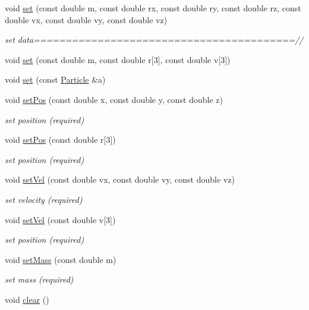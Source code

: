 \begin{DoxyCompactItemize}
void \hyperlink{classParticle_a662b86df904c9a664e0e45d93b1f4715}{set} (const double m, const double rx, const double ry, const double rz, const double vx, const double vy, const double vz)
\begin{DoxyCompactList}\small\item\em set data=========================================// \end{DoxyCompactList}\item 
void \hyperlink{classParticle_a840d9f228177200f22ef062e4cc24851}{set} (const double m, const double r\mbox{[}3\mbox{]}, const double v\mbox{[}3\mbox{]})
\item 
void \hyperlink{classParticle_a77b1b13894b46abed113c461270ed927}{set} (const \hyperlink{classParticle}{Particle} \&a)
\item 
void \hyperlink{classParticle_a97d76b66aed57834c105b78b10643b81}{set\+Pos} (const double x, const double y, const double z)
\begin{DoxyCompactList}\small\item\em set position (required) \end{DoxyCompactList}\item 
void \hyperlink{classParticle_ab3c50e74691f9264d4d4d2e72a6b9536}{set\+Pos} (const double r\mbox{[}3\mbox{]})
\begin{DoxyCompactList}\small\item\em set position (required) \end{DoxyCompactList}\item 
void \hyperlink{classParticle_a07c405254ac3f03854e7523ff473c828}{set\+Vel} (const double vx, const double vy, const double vz)
\begin{DoxyCompactList}\small\item\em set velocity (required) \end{DoxyCompactList}\item 
void \hyperlink{classParticle_a433720a7673f9645e4e203c32435e301}{set\+Vel} (const double v\mbox{[}3\mbox{]})
\begin{DoxyCompactList}\small\item\em set position (required) \end{DoxyCompactList}\item 
void \hyperlink{classParticle_a620f479862b90468a77da4e9cf5c0ff5}{set\+Mass} (const double m)
\begin{DoxyCompactList}\small\item\em set mass (required) \end{DoxyCompactList}\item 
void \hyperlink{classParticle_ab0eea4368ee797652c528949ab4ac563}{clear} ()
\end{DoxyCompactItemize}


